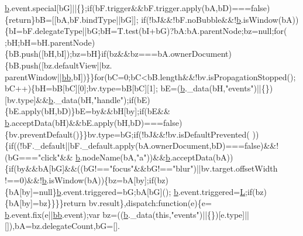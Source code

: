 \begin{DoxyCode}
      \hyperlink{a00039_aa4026ad5544b958e54ce5e106fa1c805}{b}.event.special[bG]||\{\};\textcolor{keywordflow}{if}(bF.trigger&&bF.trigger.apply(bA,bD)===\textcolor{keyword}{false})\{\textcolor{keywordflow}{return}\}bB=[[bA,bF.bindType||bG]];\textcolor{keywordflow}{
      if}(!bJ&&!bF.noBubble&&!\hyperlink{a00039_aa4026ad5544b958e54ce5e106fa1c805}{b}.isWindow(bA))\{bI=bF.delegateType||bG;bH=T.test(bI+bG)?bA:bA.parentNode;bz=null;\textcolor{keywordflow}{for}(
      ;bH;bH=bH.parentNode)\{bB.push([bH,bI]);bz=bH\}\textcolor{keywordflow}{if}(bz&&bz===bA.ownerDocument)\{bB.push([bz.defaultView||bz.
      parentWindow||\hyperlink{a00039_a1d6558865876e1c8cca029fce41a4bdb}{bb},bI])\}\}\textcolor{keywordflow}{for}(bC=0;bC<bB.length&&!bv.isPropagationStopped();bC++)\{bH=bB[bC][0];bv.type=bB[bC][1];
      bE=(\hyperlink{a00039_aa4026ad5544b958e54ce5e106fa1c805}{b}.\_data(bH,\textcolor{stringliteral}{"events"})||\{\})[bv.type]&&\hyperlink{a00039_aa4026ad5544b958e54ce5e106fa1c805}{b}.\_data(bH,\textcolor{stringliteral}{"handle"});\textcolor{keywordflow}{if}(bE)\{bE.apply(bH,bD)\}bE=by&&bH[by];\textcolor{keywordflow}{if}(bE&&
      \hyperlink{a00039_aa4026ad5544b958e54ce5e106fa1c805}{b}.acceptData(bH)&&bE.apply(bH,bD)===\textcolor{keyword}{false})\{bv.preventDefault()\}\}bv.type=bG;\textcolor{keywordflow}{if}(!bJ&&!bv.isDefaultPrevented(
      ))\{\textcolor{keywordflow}{if}((!bF.\_default||bF.\_default.apply(bA.ownerDocument,bD)===\textcolor{keyword}{false})&&!(bG===\textcolor{stringliteral}{"click"}&&
      \hyperlink{a00039_aa4026ad5544b958e54ce5e106fa1c805}{b}.nodeName(bA,\textcolor{stringliteral}{"a"}))&&\hyperlink{a00039_aa4026ad5544b958e54ce5e106fa1c805}{b}.acceptData(bA))\{\textcolor{keywordflow}{if}(by&&bA[bG]&&((bG!==\textcolor{stringliteral}{"focus"}&&bG!==\textcolor{stringliteral}{"blur"})||bv.target.offsetWidth
      !==0)&&!\hyperlink{a00039_aa4026ad5544b958e54ce5e106fa1c805}{b}.isWindow(bA))\{bz=bA[by];\textcolor{keywordflow}{if}(bz)\{bA[by]=null\}\hyperlink{a00039_aa4026ad5544b958e54ce5e106fa1c805}{b}.event.triggered=bG;bA[bG]();
      \hyperlink{a00039_aa4026ad5544b958e54ce5e106fa1c805}{b}.event.triggered=\hyperlink{a00039_a38ee4c0b5f4fe2a18d0c783af540d253}{L};\textcolor{keywordflow}{if}(bz)\{bA[by]=bz\}\}\}\}\textcolor{keywordflow}{return} bv.result\},dispatch:\textcolor{keyword}{function}(e)\{e=
      \hyperlink{a00039_aa4026ad5544b958e54ce5e106fa1c805}{b}.event.fix(e||\hyperlink{a00039_a1d6558865876e1c8cca029fce41a4bdb}{bb}.event);var bz=((\hyperlink{a00039_aa4026ad5544b958e54ce5e106fa1c805}{b}.\_data(\textcolor{keyword}{this},\textcolor{stringliteral}{"events"})||\{\})[e.type]||[]),bA=bz.delegateCount,bG=[].

\end{DoxyCode}
